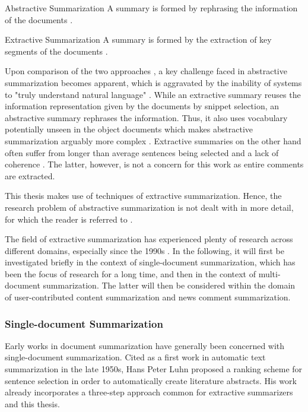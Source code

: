 \begin{definition}{Abstractive Summarization} A summary is formed by rephrasing the information of the documents \cite{Gupta2010ASO, DBLP:journals/corr/abs-1109-2128}.
\end{definition}
\begin{definition}{Extractive Summarization} A summary is formed by the extraction of key segments of the documents \cite{Gupta2010ASO, DBLP:journals/corr/abs-1109-2128}.
\end{definition}
Upon comparison of the two approaches \cite{Hahn:2000:CAS:619057.621587}, a key challenge faced in abstractive summarization becomes apparent, which is aggravated by the inability of systems to "truly understand natural language" \cite{Gupta2010ASO}. While an extractive summary reuses the information representation given by the documents by snippet selection, an abstractive summary rephrases the information. Thus, it also uses vocabulary potentially unseen in the object documents \cite{DBLP:conf/conll/NallapatiZSGX16} which makes abstractive summarization arguably more complex \cite{llewellyn_grover_oberlander}. Extractive summaries on the other hand often suffer from longer than average sentences being selected and a lack of coherence \cite{Gupta2010ASO}. The latter, however, is not a concern for this work as entire comments are extracted.
\par
This thesis makes use of techniques of extractive summarization. Hence, the research problem of abstractive summarization is not dealt with in more detail, for which the reader is referred to \cite{Das07asurvey, Hahn:2000:CAS:619057.621587,DBLP:conf/inlg/CareniniC08, DBLP:conf/coling/GanesanZH10, DBLP:journals/corr/abs-1109-2128, DBLP:conf/conll/NallapatiZSGX16, DBLP:journals/corr/PaulusXS17}. \par
The field of extractive summarization has experienced plenty of research across different domains, especially since the 1990s \cite{Das07asurvey, Hahn:2000:CAS:619057.621587, Conroy:2001:TSV:383952.384042}. In the following, it will first be investigated briefly in the context of single-document summarization, which has been the focus of research for a long time, and then in the context of multi-document summarization. The latter will then be considered within the domain of user-contributed content summarization and news comment summarization.

\subsubsection{Single-document Summarization}
Early works in document summarization have generally been concerned with single-document summarization.
Cited as a first work \cite{Das07asurvey, Jezek_automatictext} in automatic text summarization in the late 1950s, Hans Peter Luhn \cite{DBLP:journals/ibmrd/Luhn58} proposed a ranking scheme for sentence selection in order to automatically create literature abstracts.
His work already incorporates a three-step approach common for extractive summarizers \cite{DBLP:books/sp/mining2012/NenkovaM12} and this thesis.


